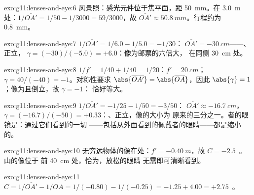 \begin{solution}{exo:g11:lenses-and-eye:6}
风景照：感光元件位于焦平面，距 \qty{50}{mm}。在
\qty{3.0}{m} 处：$1/\overline{OA'} = 1/50 - 1/3000 = 59/3000$，故
$\overline{OA'} \approx \qty{50.8}{mm}$。行程约为 \qty{0.8}{mm}。
\end{solution}

\begin{solution}{exo:g11:lenses-and-eye:7}
$1/\overline{OA'} = 1/6.0 - 1/5.0 = -1/30$：
$\overline{OA'} = \qty{-30}{cm}$——、正立，
$\gamma = (-30)/(-5.0) = +6.0$：像为邮票的六倍大，
在同侧 \qty{30}{cm} 处。
\end{solution}

\begin{solution}{exo:g11:lenses-and-eye:8}
$1/f' = 1/40 + 1/40 = 1/20$：$f' = \qty{20}{cm}$；
$\gamma = 40/(-40) = -1$。对称性要求
$\abs{\overline{OA'}} = \abs{\overline{OA}}$，因此
$\abs{\gamma} = 1$；像为且倒立，故 $\gamma = -1$：
恰好等大。
\end{solution}

\begin{solution}{exo:g11:lenses-and-eye:9}
$1/\overline{OA'} = -1/25 - 1/50 = -3/50$：
$\overline{OA'} \approx \qty{-16.7}{cm}$，
$\gamma = (-16.7)/(-50) = +0.33$：、正立，像的大小为
原来的三分之一。者的眼镜是：通过它们看到的一切
——包括从外面看到的佩戴者的眼睛——都是缩小的。
\end{solution}

\begin{solution}{exo:g11:lenses-and-eye:10}
无穷远物体的像在处：$f' = \qty{-0.40}{m}$，故
$C = -2.5$~。山的像位于
前 \qty{40}{cm} 处，恰为，放松的眼睛
无需即可清晰看到。
\end{solution}

\begin{solution}{exo:g11:lenses-and-eye:11}
$C = 1/\overline{OA'} - 1/\overline{OA} = 1/(-0.80) - 1/(-0.25)
= -1.25 + 4.00 = +2.75$~。
\end{solution}

